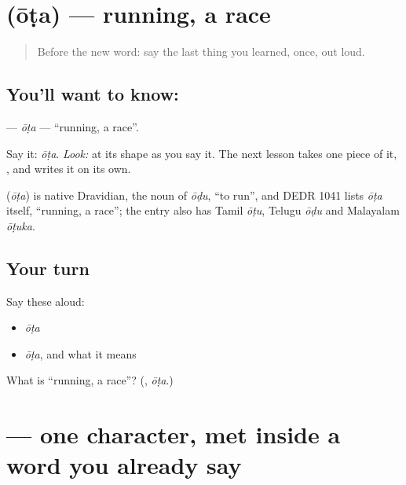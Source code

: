 \section[\texorpdfstring{\kn{ಓಟ} (ōṭa)}{ಓಟ (ōṭa)}]{ (ōṭa) — running, a race}

\label{lesson:KA-C29-oota}



\begin{quote}
Before the new word: say the last thing you learned, once, out loud.
\end{quote}

\subsection*{You'll want to know: }
\textbf{} — \emph{ōṭa} — \textquotedblleft{}running, a race\textquotedblright{}.

Say it: \emph{ōṭa}. \emph{Look:} at its shape as you say it. The next lesson takes one piece of it, \textbf{}, and writes it on its own.

\begin{cousinweb}
\textbf{} (\emph{ōṭa}) is native Dravidian, the noun of \emph{ōḍu}, \textquotedblleft{}to run\textquotedblright{}, and DEDR 1041 lists \emph{ōṭa} itself, \textquotedblleft{}running, a race\textquotedblright{}; the entry also has Tamil \emph{ōṭu}, Telugu \emph{ōḍu} and Malayalam \emph{ōṭuka}.
\end{cousinweb}

\subsection*{Your turn}
Say these aloud:

\begin{itemize}
\raggedright
  \item \emph{ōṭa}
  \item \emph{ōṭa}, and what it means
\end{itemize}

\begin{tcolorbox}[breakable,colback=teal!4,colframe=teal!35!black,title={Before you move on}]
What is \textquotedblleft{}running, a race\textquotedblright{}? (\textbf{}, \emph{ōṭa}.)
\end{tcolorbox}
\section[\texorpdfstring{\kn{ಓ} (ō)}{ಓ (ō)}]{ — one character, met inside a word you already say}

